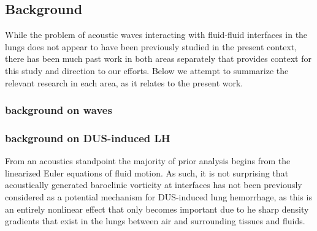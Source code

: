 \subsection*{Background}
While the problem of acoustic waves interacting with fluid-fluid
interfaces in the lungs does not appear to have been previously
studied in the present context, there has been much past work in both
areas separately that provides context for this study and direction to
our efforts. Below we attempt to summarize the relevant research in
each area, as it relates to the present work.

\subsubsection*{background on waves}

\subsubsection*{background on DUS-induced \ac{LH}}
From an acoustics standpoint the majority of prior analysis begins
from the linearized Euler equations of fluid motion. As such, it is
not surprising that acoustically generated baroclinic vorticity at
interfaces has not been previously considered as a potential mechanism
for DUS-induced lung hemorrhage, as this is an entirely nonlinear
effect that only becomes important due to he sharp density gradients
that exist in the lungs between air and surrounding tissues and
fluids.







